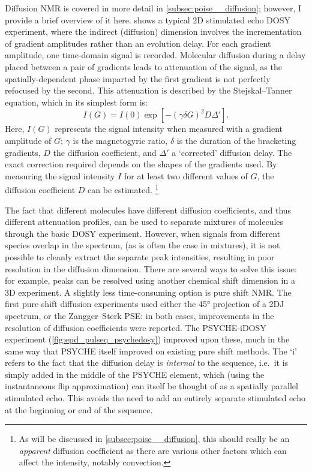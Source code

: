 Diffusion NMR\autocite{Johnson1999PNMRS} is covered in more detail in \cref{subsec:poise__diffusion}; however, I provide a brief overview of it here.
 shows a typical 2D stimulated echo DOSY experiment, where the indirect (diffusion) dimension involves the incrementation of gradient amplitudes rather than an evolution delay.
For each gradient amplitude, one time-domain signal is recorded.
Molecular diffusion during a delay placed between a pair of gradients leads to attenuation of the signal, as the spatially-dependent phase imparted by the first gradient is not perfectly refocused by the second.
This attenuation is described by the Stejskal--Tanner equation\autocite{Stejskal1965JCP,Sinnaeve2012CMR}, which in its simplest form is:
\begin{equation}
    \label{eq:stejskal_tanner}
    I(G) = I(0) \exp\left[-(\gamma\delta G)^2 D \Delta'\right].
\end{equation}
Here, $I(G)$ represents the signal intensity when measured with a gradient amplitude of $G$; $\gamma$ is the magnetogyric ratio, $\delta$ is the duration of the bracketing gradients, $D$ the diffusion coefficient, and $\Delta'$ a `corrected' diffusion delay.
The exact correction required depends on the shapes of the gradients used.
By measuring the signal intensity $I$ for at least two different values of $G$, the diffusion coefficient $D$ can be estimated.%
\footnote{As will be discussed in \cref{subsec:poise__diffusion}, this should really be an \textit{apparent} diffusion coefficient as there are various other factors which can affect the intensity, notably convection.}

The fact that different molecules have different diffusion coefficients, and thus different attenuation profiles, can be used to separate mixtures of molecules through the basic DOSY experiment.
However, when signals from different species overlap in the \proton{} spectrum, (as is often the case in mixtures), it is not possible to cleanly extract the separate peak intensities, resulting in poor resolution in the diffusion dimension.
There are several ways to solve this issue: for example, peaks can be resolved using another chemical shift dimension in a 3D experiment.
A slightly less time-consuming option is pure shift NMR.
The first pure shift diffusion experiments used either the \ang{45} projection of a 2DJ spectrum\autocite{Cobas2004JMR}, or the Zangger--Sterk PSE\autocite{Nilsson2007CC,Aguilar2010ACIE,Glanzer2014CEJ}: in both cases, improvements in the resolution of diffusion coefficients were reported.
The PSYCHE-iDOSY experiment\autocite{Foroozandeh2016ACIE} (\cref{fig:epd_pulseq_psychedosy}) improved upon these, much in the same way that PSYCHE itself improved on existing pure shift methods.
The `i' refers to the fact that the diffusion delay is \textit{internal} to the sequence, i.e.\ it is simply added in the middle of the PSYCHE element, which (using the instantaneous flip approximation) can itself be thought of as a spatially parallel stimulated echo.
This avoids the need to add an entirely separate stimulated echo at the beginning or end of the sequence.

